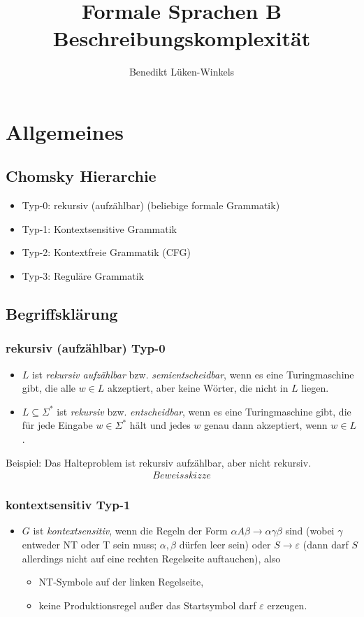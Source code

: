 \documentclass[ngerman]{scrartcl}
\title{Formale Sprachen B\\ Beschreibungskomplexit{\"a}t}
\author{Benedikt L{\"u}ken-Winkels}
\begin{document}
\maketitle
\tableofcontents
\newpage
\section{Allgemeines}
\subsection{Chomsky Hierarchie}
\begin{itemize}
\item Typ-0: rekursiv (aufzählbar) (beliebige formale Grammatik)
\item Typ-1: Kontextsensitive Grammatik
\item Typ-2: Kontextfreie Grammatik (CFG)
\item Typ-3: Reguläre Grammatik
\end{itemize}
\subsection{Begriffsklärung}
\subsubsection{rekursiv (aufzählbar) Typ-0}
\begin{itemize}
\item $L$ ist \textit{rekursiv aufzählbar} bzw. \textit{semientscheidbar}, wenn es eine Turingmaschine gibt, die alle $w \in L$ akzeptiert, aber keine Wörter, die nicht in $L$ liegen.
\item $L \subseteq \Sigma^{*}$ ist \textit{rekursiv} bzw. \textit{entscheidbar}, wenn es eine Turingmaschine gibt, die für jede Eingabe $w \in \Sigma^{*}$ hält und jedes $w$ genau dann akzeptiert, wenn $w \in L$.
\end{itemize}
Beispiel: Das Halteproblem ist rekursiv aufzählbar, aber nicht rekursiv. \\
\begin{align*}
Beweisskizze
\end{align*}

\subsubsection{kontextsensitiv Typ-1}
\begin{itemize}
\item  $G$ ist \textit{kontextsensitiv}, wenn die Regeln der Form $\alpha A \beta \rightarrow \alpha \gamma \beta $ sind (wobei $\gamma$ entweder NT oder T sein muss; $\alpha, \beta$ dürfen leer sein) oder $S \rightarrow \varepsilon $ (dann darf $S$ allerdings nicht auf eine rechten Regelseite auftauchen), also
\begin{itemize}
\item NT-Symbole auf der linken Regelseite,
\item keine Produktionsregel außer das Startsymbol darf  $\varepsilon$ erzeugen.

\end{itemize}
\end{itemize}
\end{document}
